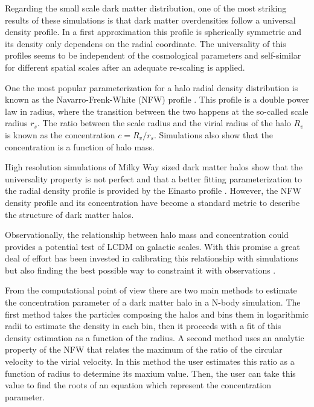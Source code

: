 \documentclass{emulateapj}
\begin{document}
Regarding the small scale dark matter distribution, one of the most
striking results of these simulations is that dark matter overdensities
follow a universal density profile.
In a first approximation this profile is spherically symmetric and its
density only dependens on the radial coordinate.
The universality of this profiles seems to be independent of the
cosmological parameters and self-similar for different spatial scales
after an adequate re-scaling is applied.
\citep{NFW,Taylor2001}

One the most popular parameterization for a halo radial density
distribution is known as the Navarro-Frenk-White (NFW) profile
\citep{NFW}.
This profile is a  double power law in radius, where the transition
between the two happens at the so-called scale radius $r_s$.
The ratio between the scale radius and the virial radius of the halo
$R_v$ is known as the concentration $c=R_v/r_s$.
Simulations also show that the concentration is a function of halo
mass.


High resolution simulations of Milky Way sized dark matter halos
\citep{Navarro2010} show that the universality property is not
perfect and that a better fitting parameterization to the radial
density profile is provided by the Einasto profile
\citep{Einasto1965}.
However, the NFW density profile and its concentration have become a
standard metric to describe the structure of dark matter
halos.


Observationally, the relationship between halo mass and concentration
could provides a potential test of LCDM on galactic scales.
With this promise a great deal of effort has been
invested in calibrating this relationship with simulations
\citep{Neto2007,Duffy2008,Munoz2011,Prada2012,Ludlow2014} but also
finding the best possible way to constraint it with observations
\citep{Buote2007,Comerford2007,Mandelbaum2008,Giocoli2014,Foex2014,Shan2015}.

From the computational point of view there are two main methods to
estimate the concentration parameter of a dark matter halo in a N-body
simulation.
The first method takes the particles composing the halos
and bins them in logarithmic radii to estimate the density in each
bin, then it proceeds with a fit of this density estimation as a
function of the radius.
A second method uses an analytic property of the
NFW that relates the maximum of the ratio of the circular velocity to
the virial velocity.
In this method the user estimates this ratio as a function of radius
to determine its maxium value.
Then, the user can take this value to find the roots of an equation
which represent the concentration parameter.
\end{document}
